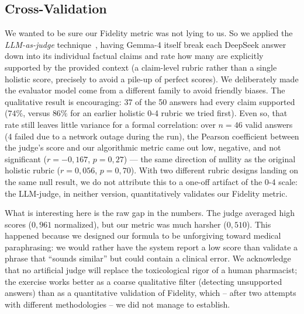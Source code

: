 \documentclass[runningheads]{llncs}
\begin{document}
\subsection{Cross-Validation}
\label{sec:llm_judge}

We wanted to be sure our Fidelity metric was not lying to us. So we applied the \emph{LLM-as-judge} technique~\cite{zheng2023mtbench}, having Gemma-4 itself break each DeepSeek answer down into its individual factual claims and rate how many are explicitly supported by the provided context (a claim-level rubric rather than a single holistic score, precisely to avoid a pile-up of perfect scores). We deliberately made the evaluator model come from a different family to avoid friendly biases. The qualitative result is encouraging: 37 of the 50 answers had every claim supported ($74\%$, versus $86\%$ for an earlier holistic 0-4 rubric we tried first). Even so, that rate still leaves little variance for a formal correlation: over $n{=}46$ valid answers (4 failed due to a network outage during the run), the Pearson coefficient between the judge's score and our algorithmic metric came out low, negative, and not significant ($r{=}{-}0{,}167$, $p{=}0{,}27$) — the same direction of nullity as the original holistic rubric ($r{=}0{,}056$, $p{=}0{,}70$). With two different rubric designs landing on the same null result, we do not attribute this to a one-off artifact of the 0-4 scale: the LLM-judge, in neither version, quantitatively validates our Fidelity metric.

What is interesting here is the raw gap in the numbers. The judge averaged high scores ($0{,}961$ normalized), but our metric was much harsher ($0{,}510$). This happened because we designed our formula to be unforgiving toward medical paraphrasing: we would rather have the system report a low score than validate a phrase that ``sounds similar'' but could contain a clinical error. We acknowledge that no artificial judge will replace the toxicological rigor of a human pharmacist; the exercise works better as a coarse qualitative filter (detecting unsupported answers) than as a quantitative validation of Fidelity, which -- after two attempts with different methodologies -- we did not manage to establish.
\end{document}
